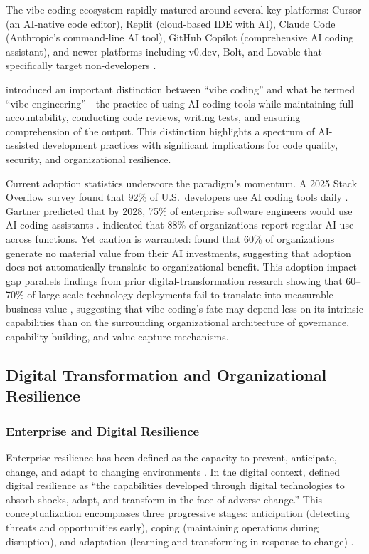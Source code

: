 \documentclass[preprint,12pt,authoryear]{elsarticle}
\begin{document}
The vibe coding ecosystem rapidly matured around several key platforms: Cursor (an AI-native code editor), Replit (cloud-based IDE with AI), Claude Code (Anthropic's command-line AI tool), GitHub Copilot (comprehensive AI coding assistant), and newer platforms including v0.dev, Bolt, and Lovable that specifically target non-developers \citep{Fawzy2025, VibeCodingAINative2025}.

\citet{Willison2025} introduced an important distinction between ``vibe coding'' and what he termed ``vibe engineering''---the practice of using AI coding tools while maintaining full accountability, conducting code reviews, writing tests, and ensuring comprehension of the output. This distinction highlights a spectrum of AI-assisted development practices with significant implications for code quality, security, and organizational resilience.

Current adoption statistics underscore the paradigm's momentum. A 2025 Stack Overflow survey found that 92\% of U.S.\ developers use AI coding tools daily \citep{StackOverflow2025}. Gartner predicted that by 2028, 75\% of enterprise software engineers would use AI coding assistants \citep{Gartner2025}. \citet{McKinsey2025} indicated that 88\% of organizations report regular AI use across functions. Yet caution is warranted: \citet{BCG2025} found that 60\% of organizations generate no material value from their AI investments, suggesting that adoption does not automatically translate to organizational benefit. This adoption-impact gap parallels findings from prior digital-transformation research showing that 60--70\% of large-scale technology deployments fail to translate into measurable business value \citep{Tabrizi2019, Saldanha2019}, suggesting that vibe coding's fate may depend less on its intrinsic capabilities than on the surrounding organizational architecture of governance, capability building, and value-capture mechanisms.


\subsection{Digital Transformation and Organizational Resilience}
\label{sec:resilience}

\subsubsection{Enterprise and Digital Resilience}

Enterprise resilience has been defined as the capacity to prevent, anticipate, change, and adapt to changing environments \citep{Sanchis2019}. In the digital context, \citet{Heeks2019} defined digital resilience as ``the capabilities developed through digital technologies to absorb shocks, adapt, and transform in the face of adverse change.'' This conceptualization encompasses three progressive stages: anticipation (detecting threats and opportunities early), coping (maintaining operations during disruption), and adaptation (learning and transforming in response to change) \citep{Heeks2019, Holling1973}.
\end{document}
